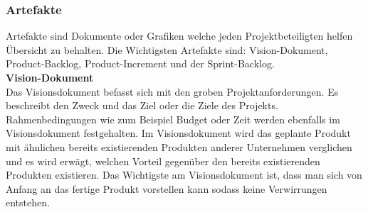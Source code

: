 	\subsubsection{Artefakte}
	\label{sec:Artefakte}
		Artefakte sind Dokumente oder Grafiken welche jeden Projektbeteiligten helfen Übersicht zu behalten. Die Wichtigsten Artefakte sind: Vision-Dokument, Product-Backlog, Product-Increment und der Sprint-Backlog.\\
		
			\textbf{Vision-Dokument}\\
				Das Visionsdokument befasst sich mit den groben Projektanforderungen. Es beschreibt den Zweck und das Ziel oder die Ziele des Projekts. Rahmenbedingungen wie zum Beispiel Budget oder Zeit werden ebenfalls im Visionsdokument festgehalten. Im Visionsdokument wird das geplante Produkt mit ähnlichen bereits existierenden Produkten anderer Unternehmen verglichen und es wird erwägt, welchen Vorteil gegenüber den bereits existierenden Produkten existieren.
			Das Wichtigste am Visionsdokument ist, dass man sich von Anfang an das fertige Produkt vorstellen kann sodass keine Verwirrungen entstehen. \\ 
						

